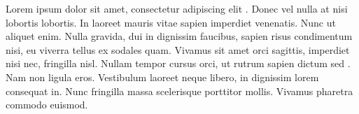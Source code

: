 \label{sec:description}
Lorem ipsum dolor sit amet, consectetur adipiscing elit \cite{Anderson2006, ekman1978facial}. Donec vel nulla at nisi lobortis lobortis. In laoreet mauris vitae sapien imperdiet venenatis. Nunc ut aliquet enim. Nulla gravida, dui in dignissim faucibus, sapien risus condimentum nisi, eu viverra tellus ex sodales quam. Vivamus sit amet orci sagittis, imperdiet nisi nec, fringilla nisl. Nullam tempor cursus orci, ut rutrum sapien dictum sed \cite{Cohen2003}. Nam non ligula eros. Vestibulum laoreet neque libero, in dignissim lorem consequat in. Nunc fringilla massa scelerisque porttitor mollis. Vivamus pharetra commodo euismod.